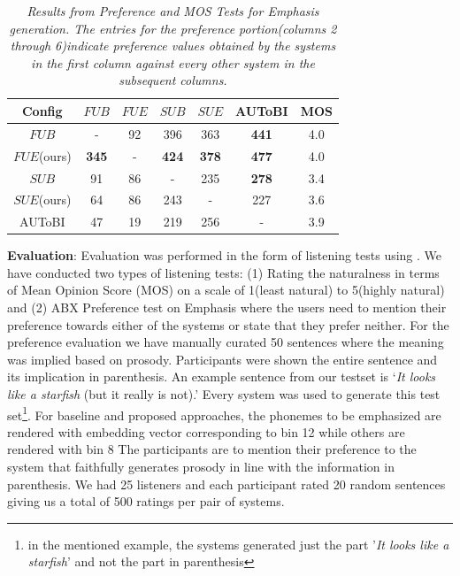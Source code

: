 \begin{table}[t]
\centering
\caption{\textit{Results from Preference and MOS Tests for Emphasis generation. The entries for the preference portion(columns 2 through 6)indicate preference values obtained by the systems in the first column against every other system in the subsequent columns.}} 
\small
\setlength\tabcolsep{2pt}
\begin{tabular}{|c|c|c|c|c|c|| c| }
  \hline
 Config &  $FUB$ &  $FUE$ & $SUB$ & $SUE$ & AUToBI & MOS\\
  \hline
  $FUB$ &  -  & 92 & 396 & 363 & \textbf{441} & 4.0\\
  \hline
  $FUE$(ours) &  \textbf{345} & - & \textbf{424}  & \textbf{378} & \textbf{477} & 4.0 \\
  \hline
 $SUB$ &  91 & 86 & - & 235 & \textbf{278} & 3.4 \\
  \hline
 $SUE$(ours) &  64 & 86 &  243 & - & 227 & 3.6 \\
  \hline
 AUToBI &  47 & 19 & 219 & 256 & - & 3.9 \\
  \hline
\end{tabular}
\label{table_results_quantvsautobi}
\end{table}

\textbf{Evaluation}:
Evaluation was performed  in the form of listening tests using \citep{testvox_parlikar}. We have conducted two types of listening tests: (1) Rating the naturalness in  terms of Mean Opinion Score (MOS) on a scale of 1(least natural) to 5(highly natural) and (2) ABX Preference test on Emphasis where the users need to mention their preference towards either of the systems or state that they prefer neither. For the preference evaluation we have manually curated 50 sentences where the meaning was implied based on prosody. Participants were shown the entire sentence and its implication in parenthesis. An example sentence from our testset is `\textit{It looks like a starfish} (but it really is not).' Every system was used to generate this test set\footnote{in the mentioned example, the systems generated just the part '\textit{It looks like a starfish}' and not the part in parenthesis}. For baseline and proposed approaches, the phonemes to be emphasized are rendered with embedding vector corresponding to bin 12 while others are rendered with bin 8 The participants are to mention their preference to the system that faithfully generates prosody in line with the information in parenthesis. We had 25 listeners and each participant rated 20 random sentences giving us a total of 500 ratings per pair of systems.


